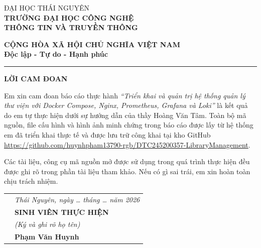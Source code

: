 \documentclass[../main.tex]{subfiles}
\begin{document}
\noindent
\begin{minipage}[t]{0.45\textwidth}
\centering
ĐẠI HỌC THÁI NGUYÊN \\
\textbf{TRƯỜNG ĐẠI HỌC CÔNG NGHỆ} \\
\textbf{THÔNG TIN VÀ TRUYỀN THÔNG}
\end{minipage}%
\begin{minipage}[t]{0.59\textwidth}
\centering
\textbf{CỘNG HÒA XÃ HỘI CHỦ NGHĨA VIỆT NAM} \\
\textbf{Độc lập - Tự do - Hạnh phúc} \\
\rule{0.6\linewidth}{0.4pt}
\end{minipage}

\vspace{1cm}

\begin{center}
\textbf{LỜI CAM ĐOAN}
\end{center}

\vspace{0.5cm}

Em xin cam đoan báo cáo thực hành \textit{``Triển khai và quản trị hệ thống quản lý thư viện với Docker Compose, Nginx, Prometheus, Grafana và Loki''} là kết quả do em tự thực hiện dưới sự hướng dẫn của thầy Hoàng Văn Tâm. Toàn bộ mã nguồn, file cấu hình và hình ảnh minh chứng trong báo cáo được lấy từ hệ thống em đã triển khai thực tế và được lưu trữ công khai tại kho GitHub \url{https://github.com/huynhpham13790-rgb/DTC245200357-LibraryManagement}.

Các tài liệu, công cụ mã nguồn mở được sử dụng trong quá trình thực hiện đều được ghi rõ trong phần tài liệu tham khảo. Nếu có gì sai trái, em xin hoàn toàn chịu trách nhiệm.

\vspace{1cm}

\begin{tabular}{p{} >{\centering\arraybackslash}p{}}
 & \textit{Thái Nguyên, ngày \ldots{} tháng \ldots{} năm 2026} \\[0.5cm]
 & \textbf{SINH VIÊN THỰC HIỆN} \\
 & \textit{(Ký và ghi rõ họ tên)} \\[2.5cm]
 & \textbf{Phạm Văn Huynh} \\
\end{tabular}
\end{document}
